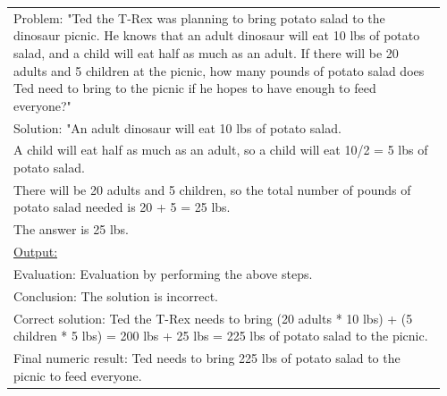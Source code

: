 \documentclass[10pt]{article} %
\begin{document}
\begin{table}[t]
\begin{center}
\begin{tabular}{|p{0.96\linewidth}|}
          Problem: "Ted the T-Rex was planning to bring potato salad to the dinosaur picnic.  He knows that an adult dinosaur will eat 10 lbs of potato salad, and a child will eat half as much as an adult.  If there will be 20 adults and 5 children at the picnic, how many pounds of potato salad does Ted need to bring to the picnic if he hopes to have enough to feed everyone?" \\
          Solution: "An adult dinosaur will eat 10 lbs of potato salad. \\
          A child will eat half as much as an adult, so a child will eat 10/2 = 5 lbs of potato salad.\\
          There will be 20 adults and 5 children, so the total number of pounds of potato salad needed is 20 + 5 = 25 lbs.\\
          The answer is 25 lbs. \\
          \hline
          \underline{Output:} \\
          Evaluation: Evaluation by performing the above steps.\\
          Conclusion: The solution is incorrect.\\
          Correct solution: Ted the T-Rex needs to bring (20 adults * 10 lbs) + (5 children * 5 lbs) = 200 lbs + 25 lbs = 225 lbs of potato salad to the picnic.\\
          Final numeric result: Ted needs to bring 225 lbs of potato salad to the picnic to feed everyone.\\
          \hline
          \end{tabular}
          \end{center}
          \end{table}
        
\end{document}
